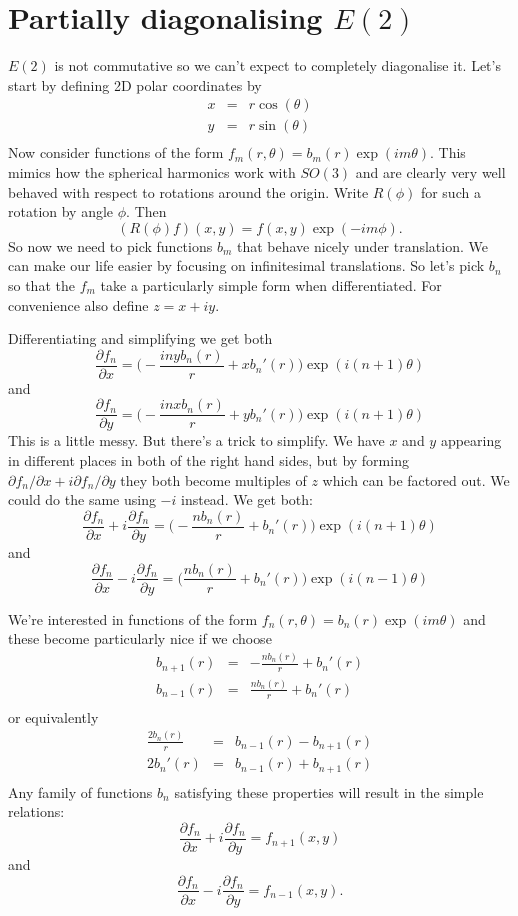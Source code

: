 \documentclass{article}
\begin{document}
\section{Partially diagonalising $E(2)$}
$E(2)$ is not commutative so we can't expect to completely diagonalise it.
Let's start by defining 2D polar coordinates by
\begin{align*}
x & = & r\cos(\theta) \\
y & = & r\sin(\theta) \\
\end{align*}
Now consider functions of the form $f_m(r,\theta)=b_m(r)\exp(im\theta)$.
This mimics how the spherical harmonics work with $SO(3)$ and are clearly very well behaved with respect to rotations around the origin.
Write $R(\phi)$ for such a rotation by angle $\phi$.
Then 
\[
(R(\phi)f)(x,y) = f(x,y)\exp(-im\phi).
\]
So now we need to pick functions $b_m$ that behave nicely under translation.
We can make our life easier by focusing on infinitesimal translations.
So let's pick $b_n$ so that the $f_m$ take a particularly simple form when differentiated.
For convenience also define $z=x+iy$.

Differentiating and simplifying we get both
\[
\frac{\partial f_n}{\partial x} = 
    \Big(-\frac{inyb_n(r)}{r}+xb_n'(r)\Big)\exp(i(n+1)\theta)
\]
and
\[
\frac{\partial f_n}{\partial y} = 
    \Big(-\frac{inxb_n(r)}{r}+yb_n'(r)\Big)\exp(i(n+1)\theta)
\]
This is a little messy.
But there's a trick to simplify.
We have $x$ and $y$ appearing in different places in both of the right hand sides, but by forming $\partial f_n/\partial x+i\partial f_n/\partial y$ they both become multiples of $z$ which can be factored out.
We could do the same using $-i$ instead.
We get both:
\[
\frac{\partial f_n}{\partial x}+i\frac{\partial f_n}{\partial y} =
    \Big(-\frac{nb_n(r)}{r}+b_n'(r)\Big)\exp(i(n+1)\theta)
\]
and
\[
\frac{\partial f_n}{\partial x}-i\frac{\partial f_n}{\partial y} =
    \Big(\frac{nb_n(r)}{r}+b_n'(r)\Big)\exp(i(n-1)\theta)
\]

We're interested in functions of the form
$f_n(r,\theta)=b_n(r)\exp(im\theta)$
and these become particularly nice if we choose
\begin{align*}
b_{n+1}(r) & = & -\frac{nb_n(r)}{r}+b_n'(r) \\
b_{n-1}(r) & = & \frac{nb_n(r)}{r}+b_n'(r) \\
\end{align*}
or equivalently
\begin{align*}
\frac{2b_n(r)}{r} & = & b_{n-1}(r)-b_{n+1}(r) \\
2b_n'(r) & = & b_{n-1}(r)+b_{n+1}(r) \\
\end{align*}
Any family of functions $b_n$ satisfying these properties will result in the simple relations:
\[
\frac{\partial f_n}{\partial x}+i\frac{\partial f_n}{\partial y} =
    f_{n+1}(x,y)
\]
and
\[
\frac{\partial f_n}{\partial x}-i\frac{\partial f_n}{\partial y} =
    f_{n-1}(x,y).
\]
\end{document}
